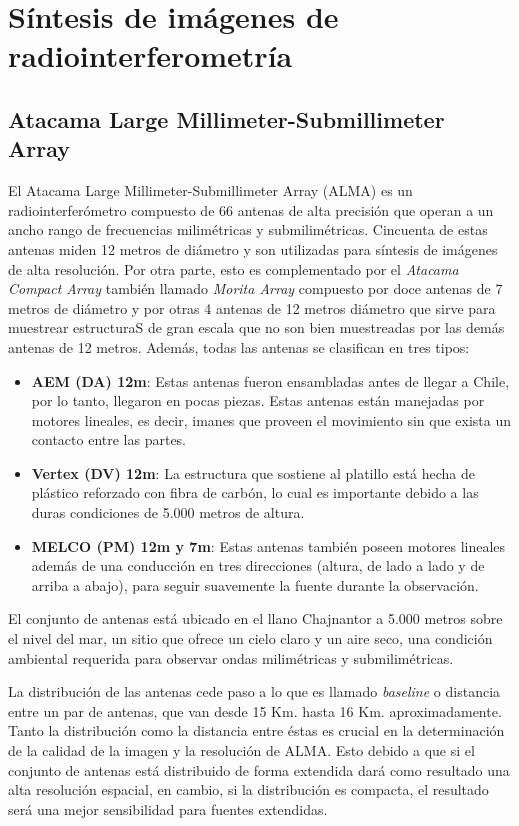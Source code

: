\chapter{Síntesis de imágenes de radiointerferometría}
\label{cap:imagesynthesisinterferometry}

\section{Atacama Large Millimeter-Submillimeter Array}

El Atacama Large Millimeter-Submillimeter Array (ALMA) es un radiointerferómetro compuesto de 66 antenas de alta precisión que operan a un ancho rango de frecuencias milimétricas y submilimétricas. Cincuenta de estas antenas miden 12 metros de diámetro y son utilizadas para síntesis de imágenes de alta resolución. Por otra parte, esto es complementado por el \textit{Atacama Compact Array} también llamado \textit{Morita Array} compuesto por doce antenas de 7 metros de diámetro y por otras 4 antenas de 12 metros diámetro que sirve para muestrear estructuraS de gran escala que no son bien muestreadas por las demás antenas de 12 metros. Además, todas las antenas se clasifican en tres tipos:

\begin{itemize}
\item \textbf{AEM (DA) 12m}: Estas antenas fueron ensambladas antes de llegar a Chile, por lo tanto, llegaron en pocas piezas. Estas antenas están manejadas por motores lineales, es decir, imanes que proveen el movimiento sin que exista un contacto entre las partes.
\item \textbf{Vertex (DV) 12m}: La estructura que sostiene al platillo está hecha de plástico reforzado con fibra de carbón, lo cual es importante debido a las duras condiciones de 5.000 metros de altura.
\item \textbf{MELCO (PM) 12m y 7m}: Estas antenas también poseen motores lineales además de una conducción en tres direcciones (altura, de lado a lado y de arriba a abajo), para seguir suavemente la fuente durante la observación.
\end{itemize}

El conjunto de antenas está ubicado en el llano Chajnantor a 5.000 metros sobre el nivel del mar, un sitio que ofrece un cielo claro y un aire seco, una condición ambiental requerida para observar ondas milimétricas y submilimétricas.

La distribución de las antenas cede paso a lo que es llamado \textit{baseline} o distancia entre un par de antenas, que van desde 15 Km. hasta 16 Km. aproximadamente. Tanto la distribución como la distancia entre éstas es crucial en la determinación de la calidad de la imagen y la resolución de ALMA. Esto debido a que si el conjunto de antenas está distribuido de forma extendida dará como resultado una alta resolución espacial, en cambio, si la distribución es compacta, el resultado será una mejor sensibilidad para fuentes extendidas.

